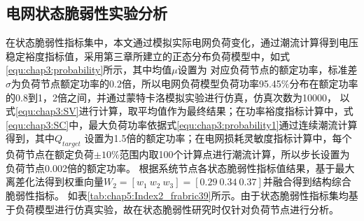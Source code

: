 \subsection{电网状态脆弱性实验分析}
\label{sec:singleAnalysis_status}
在状态脆弱性指标集中，本文通过模拟实际电网负荷变化，通过潮流计算得到电压稳定裕度指标值，采用第三章所建立的正态分布负荷模型中，如式\ref{equ:chap3:probability}所示，其中均值$\mu$设置为
对应负荷节点的额定功率，标准差$\sigma$为负荷节点额定功率的$0.2$倍，所以电网负荷模型负荷功率95.45$\%$分布在额定功率的0.8到1，2倍之间，并通过蒙特卡洛模拟实验进行仿真，仿真次数为10000，
以式\ref{equ:chap3:SV}进行计算，取平均值作为最终结果；在功率裕度指标计算中，式\ref{equ:chap3:SC}中，最大负荷功率依据式\ref{equ:chap3:probability1}通过连续潮流计算得到，其中$Q_{target}$
设置为1.5倍的额定功率；在电网损耗灵敏度指标计算中，每个负荷节点在额定负荷$\pm 10 \%$范围内取100个计算点进行潮流计算，所以步长设置为负荷节点0.002倍的额定功率。
根据系统节点各状态脆弱性指标值结果，基于最大离差化法得到权重向量$W_2 = \left[w_{1}\ w_{2}\ w_{3}\right]=[0.29\ 0.34\ 0.37]$并融合得到结构综合脆弱性指标。
如表\ref{tab:chap5:Index2_frabric39}所示。由于状态脆弱性指标集均基于负荷模型进行仿真实验，故在状态脆弱性研究时仅针对负荷节点进行分析。

